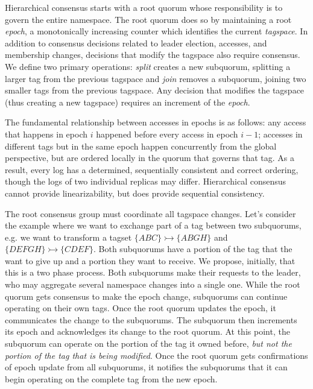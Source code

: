 \documentclass{article}
\begin{document}
Hierarchical consensus starts with a root quorum whose responsibility is to govern the entire namespace. The root quorum does so by maintaining a root \textit{epoch}, a monotonically increasing counter which identifies the current \textit{tagspace}. In addition to consensus decisions related to leader election, accesses, and membership changes, decisions that modify the tagspace also require consensus. We define two primary operations: \textit{split} creates a new subquorum, splitting a larger tag from the previous tagspace and \textit{join} removes a subquorum, joining two smaller tags from the previous tagspace. Any decision that modifies the tagspace (thus creating a new tagspace) requires an increment of the \textit{epoch}.

The fundamental relationship between accesses in epochs is as follows: any access that happens in epoch $i$ happened before every access in epoch $i-1$; accesses in different tags but in the same epoch happen concurrently from the global perspective, but are ordered locally in the quorum that governs that tag. As a result, every log has a determined, sequentially consistent and correct ordering, though the logs of two individual replicas may differ. Hierarchical consensus cannot provide linearizability, but does provide sequential consistency.

The root consensus group must coordinate all tagspace changes. Let's consider the example where we want to exchange part of a tag between two subquorums, e.g. we want to transform a tagset $\{ABC\} \rightarrowtail \{ABGH\}$ and $\{DEFGH\} \rightarrowtail \{CDEF\}$. Both subquorums have a portion of the tag that the want to give up and a portion they want to receive. We propose, initially, that this is a two phase process. Both subquorums make their requests to the leader, who may aggregate several namespace changes into a single one. While the root quorum gets consensus to make the epoch change, subquorums can continue operating on their own tags. Once the root quorum updates the epoch, it communicates the change to the subquorums. The subquorum then increments its epoch and acknowledges its change to the root quorum. At this point, the subquorum can operate on the portion of the tag it owned before, \emph{but not the portion of the tag that is being modified}. Once the root quorum gets confirmations of epoch update from all subquorums, it notifies the subquorums that it can begin operating on the complete tag from the new epoch.
\end{document}
